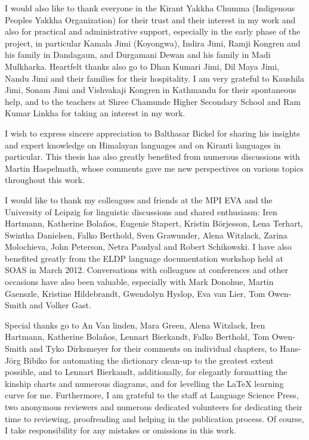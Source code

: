 I would also like to thank everyone in the Kirant Yakkha Chumma (Indigenous Peoples Yakkha Organization) for their trust and their interest in my work and also for practical and administrative support, especially in the early phase of the project, in particular Kamala Jimi (Koyongwa), Indira Jimi, Ramji Kongren and his family in Dandagaun, and Durgamani Dewan and his family in Madi Mulkharka. Heartfelt thanks also go to Dhan Kumari Jimi, Dil Maya Jimi, Nandu Jimi and their families for their hospitality. I am very grateful to Kaushila Jimi, Sonam Jimi and Vishvakaji Kongren in Kathmandu for their spontaneous help, and to the teachers at Shree Chamunde Higher Secondary School and Ram Kumar Linkha for taking an interest in my work.

I wish to express sincere appreciation to Balthasar Bickel for sharing his insights and expert knowledge on Himalayan languages and on Kiranti languages in particular. This thesis has also greatly  benefited from numerous discussions with Martin Haspelmath, whose comments gave me new perspectives on various topics throughout this work. 

I would like to thank my colleagues and friends at the MPI EVA and the University of Leipzig for linguistic discussions and shared enthusiasm: Iren Hartmann, Katherine Bolaños, Eugenie Stapert, Kristin Börjesson, Lena Terhart, Swintha Da\-niel\-sen, Falko Berthold, Sven Grawunder, Alena Witzlack, Zarina Molochieva, John Peterson, Netra Paudyal and Robert Schikowski. I have also benefited greatly from the  ELDP language documentation workshop held at SOAS in March 2012. Conversations with colleagues at conferences and other occasions have also been valuable, especially with Mark Donohue, Martin Gaenszle, Kristine Hildebrandt, Gwendolyn Hyslop,  Eva van Lier,  Tom Owen-Smith and Volker Gast. 

Special thanks go to An Van linden,  Mara Green, Alena Witzlack, Iren Hartmann, Katherine Bolaños, Lennart Bierkandt, Falko Berthold, Tom Owen-Smith and Tyko Dirksmeyer for their comments on individual chapters, to Hans-Jörg Bibiko for auto\-mating the dictionary clean-up to the greatest extent possible, and to Lennart Bierkandt, additionally,  for elegantly formatting the kinship charts  and numerous diagrams, and for levelling the  LaTeX learning curve for me. Furthermore, I am grateful to the staff at Language Science Press, two anonymous reviewers and numerous dedicated volunteers for dedicating their time to reviewing, proofreading and helping in the publication process. Of course, I take responsibility for any mistakes or omissions in this work.

